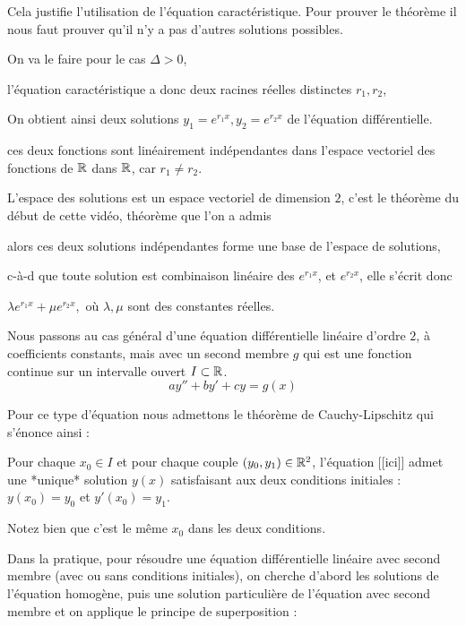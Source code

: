 \change
Cela justifie l'utilisation de l'équation caractéristique.
Pour prouver le théorème il nous faut prouver qu'il n'y a pas d'autres solutions possibles.

\change
On va le faire pour le cas $\Delta>0$,

\change
l'équation caractéristique a donc deux racines réelles
distinctes $r_1, r_2$,

\change
On obtient ainsi deux solutions $y_1=e^{r_1x},
y_2=e^{r_2x}$ de l'équation différentielle.

\change
ces deux fonctions sont linéairement indépendantes 
dans l'espace vectoriel des fonctions de $\mathbb{R}$ dans $\mathbb{R}$,
car $r_1 \neq r_2$.


\change
L'espace des solutions est un espace vectoriel de dimension $2$,
c'est le théorème du début de cette vidéo, théorème que l'on a admis

\change
alors ces deux solutions indépendantes forme une base de
l'espace de solutions,


\change

c-à-d que toute solution est combinaison linéaire des
$e^{r_1x}$, et $e^{r_2x}$, elle s'écrit donc 

$\lambda e^{r_1x} + \mu e^{r_2x},$ où $\lambda,
\mu$ sont des constantes réelles.

\diapo

Nous passons au cas général d'une équation différentielle linéaire d'ordre $2$, à coefficients constants,
mais avec un second membre $g$ qui est une fonction continue sur
un intervalle ouvert $I \subset \mathbb{R}$.
\begin{equation}
ay''+by'+cy=g(x) 
\tag{$E$}
\end{equation}

\change
Pour ce type d'équation nous admettons le théorème de Cauchy-Lipschitz 
qui s'énonce ainsi : 

Pour chaque $x_0\in I$ et pour chaque couple $(y_0,y_1) \in \mathbb{R}^2$,  
l'équation [[ici]] admet une *unique*
solution $y(x)$ satisfaisant aux deux conditions initiales : 
$y(x_0) = y_0$ \quad et \quad $y'(x_0) = y_1$.

Notez bien que c'est le même $x_0$ dans les deux conditions.

\change

Dans la pratique, pour résoudre une équation différentielle linéaire avec second membre
(avec ou sans conditions initiales), on cherche d'abord les solutions de l'équation homogène,
puis une solution particulière de l'équation avec second membre et on applique
le principe de superposition :

